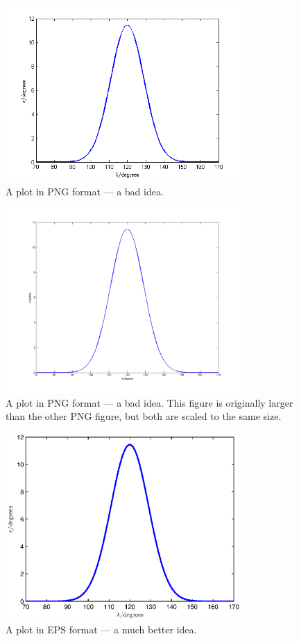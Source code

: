 \begin{figure}[htb]
	\centering
		\includegraphics[width=0.8\textwidth]{figures/constraint_png.png}
	\caption{A plot in PNG format --- a bad idea.}
	\label{fig:constraint_png}
\end{figure}

\begin{figure}[htb]
	\centering
		\includegraphics[width=0.8\textwidth]{figures/constraint_png_large.png}
	\caption{A plot in PNG format --- a bad idea. This figure is originally larger than the other PNG figure, but both are scaled to the same size.}
	\label{fig:constraint_png_large}
\end{figure}

\begin{figure}[htb]
	\centering
		\includegraphics[width=0.8\textwidth]{figures/constraint_eps.eps}
	\caption{A plot in EPS format --- a much better idea.}
	\label{fig:constraint_eps}
\end{figure}
